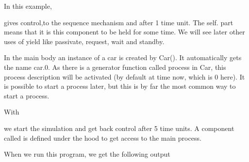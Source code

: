 \documentclass[letterpaper,10pt,english]{sphinxmanual}
\begin{document}
In this example,

%
\begin{sphinxVerbatim}[commandchars=\\\{\}]
 
\end{sphinxVerbatim}

gives control,to the sequence mechanism and  after 1 time unit. The self. part means that
it is this component to be held for some time. We will see later other uses of yield like passivate,
request, wait and standby.

In the main body an instance of a car is created by Car(). It automatically gets the name car.0.
As there is a generator function called
process in Car, this process description will be activated (by default at time now, which is 0 here).
It is possible to start a process later, but this is by far the most common way to start a process.

With

%
\begin{sphinxVerbatim}[commandchars=\\\{\}]
\end{sphinxVerbatim}

we start the simulation and get back control after 5 time units. A component called  is defined
under the hood to get access to the main process.

When we run this program, we get the following output
\end{document}
